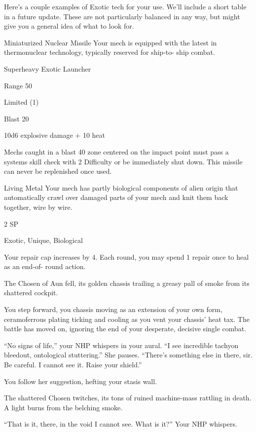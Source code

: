 Here’s a couple examples of Exotic tech for your use. We’ll include a short table in a future  
update. These are not particularly balanced in any way, but might give you a general idea of what  
to look for.
 

Miniaturized Nuclear Missile  
Your mech is equipped with the latest in thermonuclear technology, typically reserved for ship-to- 
ship combat.  

Superheavy Exotic Launcher
 
Range 50
 
Limited (1)
 
Blast 20
 
10d6 explosive damage + 10 heat
 

Mechs caught in a blast 40 zone centered on the impact point must pass a systems skill check  
with 2 Difficulty or be immediately shut down. This missile can never be replenished once used.
 

Living Metal  
Your mech has partly biological components of alien origin that automatically crawl over damaged  
parts of your mech and knit them back together, wire by wire.  

                                                                                                             


2 SP
 
Exotic, Unique, Biological
 
Your repair cap increases by 4. Each round, you may spend 1 repair once to heal as an end-of- 
round action.
 

The Chosen of Aun fell, its golden chassis trailing a greasy pall of smoke from its shattered  
cockpit.   

You step forward, you chassis moving as an extension of your own form, ceramoferrous plating  
ticking and cooling as you vent your chassis’ heat tax. The battle has moved on, ignoring the end  
of your desperate, decisive single combat.    

“No signs of life,” your NHP whispers in your aural. “I see incredible tachyon bleedout,  
ontological stuttering.” She pauses. “There’s something else in there, sir. Be careful. I cannot see  
it. Raise your shield.”   

You follow her suggestion, hefting your stasis wall.   

The shattered Chosen twitches, its tons of ruined machine-mass rattling in death. A light burns  
from the belching smoke.   

“That is it, there, in the void I cannot see. What is it?” Your NHP whispers.   

